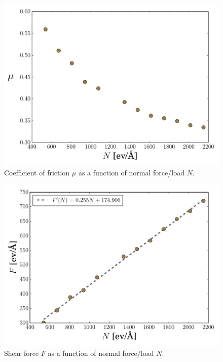\documentclass[twoside,english]{uiofysmaster}
\begin{document}
\begin{figure}[H]
	\centering
	\includegraphics[width=0.7\linewidth]{figures/friction/scalingCoeffisient/UvsN}
	\caption{Coefficient of friction $\mu$ as a function of normal force/load $N$.}
	\label{fig:uvsn}
\end{figure}

\vfill
\begin{figure}[H]
	\centering
	\includegraphics[width=0.7\linewidth]{figures/friction/scalingCoeffisient/FvsN}
	\caption{Shear force $F$ as a function of normal force/load $N$.}
	\label{fig:fvsn}
\end{figure}


\newpage
\end{document}
